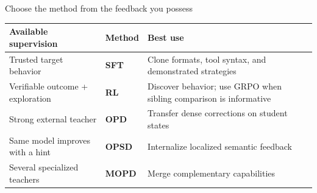 \begin{frame}[t]{Choose the method from the feedback you possess}
  \renewcommand{\arraystretch}{1.28}
  \small
  \begin{tabular}{L{0.29\textwidth}L{0.15\textwidth}L{0.42\textwidth}}
    \toprule
    \textbf{Available supervision} & \textbf{Method} & \textbf{Best use} \\
    \midrule
    Trusted target behavior & \textcolor{DeckBlue}{\textbf{SFT}} & Clone formats, tool syntax, and demonstrated strategies \\
    Verifiable outcome + exploration & \textcolor{DeckGold}{\textbf{RL}} & Discover behavior; use GRPO when sibling comparison is informative \\
    Strong external teacher & \textcolor{DeckTeal}{\textbf{OPD}} & Transfer dense corrections on student states \\
    Same model improves with a hint & \textcolor{DeckTeal}{\textbf{OPSD}} & Internalize localized semantic feedback \\
    Several specialized teachers & \textcolor{DeckTeal}{\textbf{MOPD}} & Merge complementary capabilities \\
    \bottomrule
  \end{tabular}

\end{frame}
